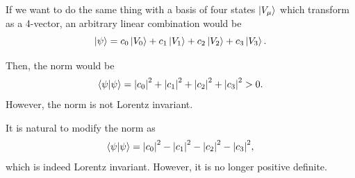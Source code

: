 \documentclass[11pt]{article}
\theoremstyle{definition}
\begin{document}
If we want to do the same thing with a basis of four states $\ket{V_\mu}$ which transform as a 4-vector, an arbitrary linear combination would be\
\begin{equation}
    \ket{\psi} = c_0\ket{V_0} + c_1\ket{V_1} + c_2\ket{V_2} + c_3\ket{V_3}.
\end{equation}

Then, the norm would be
\begin{equation}
    \braket{\psi}{\psi} = \abs{c_0}^2 + \abs{c_1}^2 +  \abs{c_2}^2 + \abs{c_3}^2 > 0.
\end{equation}
However, the norm is not Lorentz invariant.

It is natural to modify the norm as
\begin{equation}
     \braket{\psi}{\psi} = \abs{c_0}^2 - \abs{c_1}^2 -  \abs{c_2}^2 - \abs{c_3}^2,
\end{equation}
which is indeed Lorentz invariant. However, it is no longer positive definite. 
\end{document}
